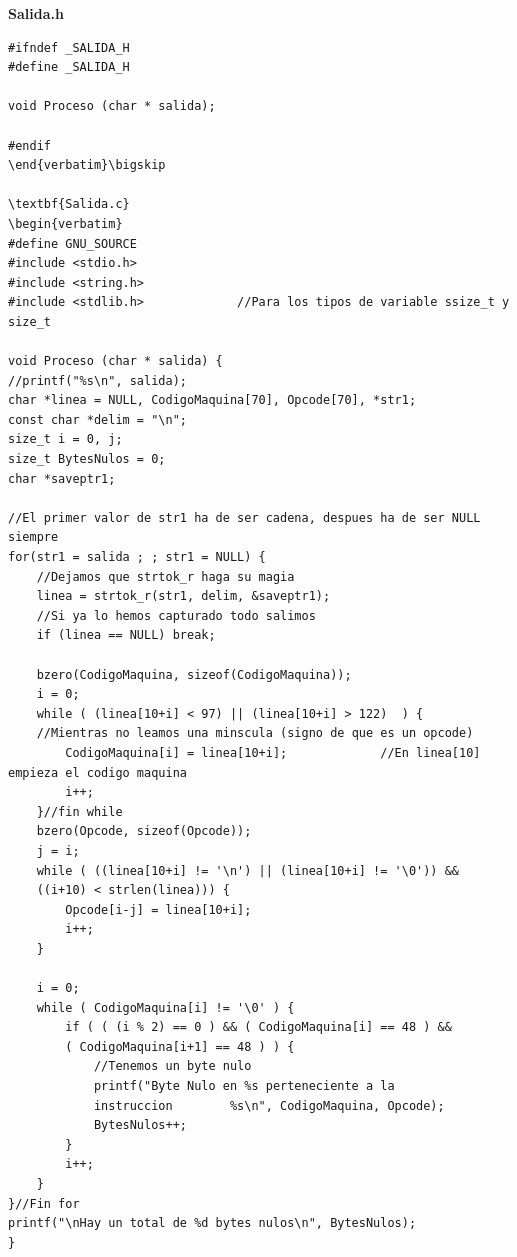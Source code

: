 \documentclass [titlepage, 12pt]{article}
\begin{document}
\textbf{Salida.h}
\lstset{language=C++,caption=Salida.h}
\begin{lstlisting}
#ifndef _SALIDA_H
#define _SALIDA_H

void Proceso (char * salida);

#endif
\end{verbatim}\bigskip

\textbf{Salida.c}
\begin{verbatim}
#define GNU_SOURCE
#include <stdio.h>
#include <string.h>
#include <stdlib.h>				//Para los tipos de variable ssize_t y size_t

void Proceso (char * salida) {
//printf("%s\n", salida);
char *linea = NULL, CodigoMaquina[70], Opcode[70], *str1;
const char *delim = "\n";
size_t i = 0, j;
size_t BytesNulos = 0;
char *saveptr1;

//El primer valor de str1 ha de ser cadena, despues ha de ser NULL siempre
for(str1 = salida ; ; str1 = NULL) {
	//Dejamos que strtok_r haga su magia
	linea = strtok_r(str1, delim, &saveptr1);
	//Si ya lo hemos capturado todo salimos
	if (linea == NULL) break;
	
	bzero(CodigoMaquina, sizeof(CodigoMaquina));
	i = 0;
	while ( (linea[10+i] < 97) || (linea[10+i] > 122)  ) {	
	//Mientras no leamos una minscula (signo de que es un opcode)
		CodigoMaquina[i] = linea[10+i];				//En linea[10] empieza el codigo maquina	
		i++;
	}//fin while
	bzero(Opcode, sizeof(Opcode));
	j = i;
	while ( ((linea[10+i] != '\n') || (linea[10+i] != '\0')) && 
	((i+10) < strlen(linea))) {
		Opcode[i-j] = linea[10+i];
		i++;
	}
	
	i = 0;
	while ( CodigoMaquina[i] != '\0' ) {
		if ( ( (i % 2) == 0 ) && ( CodigoMaquina[i] == 48 ) && 
		( CodigoMaquina[i+1] == 48 ) ) {
			//Tenemos un byte nulo
			printf("Byte Nulo en %s perteneciente a la 
			instruccion        %s\n", CodigoMaquina, Opcode);
			BytesNulos++;
		}
		i++;
	}
}//Fin for
printf("\nHay un total de %d bytes nulos\n", BytesNulos);
}
\end{lstlisting}\bigskip
\end{document}
